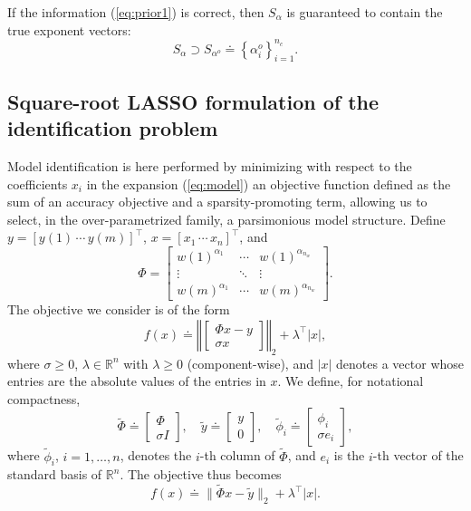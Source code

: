 \documentclass[11pt]{article}
\newcommand{\beq}{\begin{equation}}
\newcommand{\eeq}{\end{equation}}
\begin{document}
If the information (\ref{eq:prior1}) is correct, then $S_{\alpha}$
is guaranteed to contain the true exponent vectors:
\[
S_{\alpha}\supset S_{\alpha^{o}}\doteq\left\{ \alpha_{i}^{o}\right\} _{i=1}^{n_{c}}.
\]

\subsection{Square-root LASSO formulation of the identification problem}
Model identification is here performed by minimizing with respect to the coefficients $x_{i}$
in the expansion (\ref{eq:model})
an objective function defined as the sum of an accuracy objective
and a sparsity-promoting
term, allowing us to select, in the over-parametrized family, a parsimonious model structure. 
Define
 $y=[y(1)\,\cdots\, y(m)]^{\top}$, $x=[x_{1}\,\cdots\, x_{n}]^{\top}$,
and 
\[
\Phi=\left[\begin{array}{ccc}
w(1)^{\alpha_{1}} & \cdots & w(1)^{\alpha_{n_{w}}}\\
\vdots & \ddots & \vdots\\
w(m)^{\alpha_{1}} & \cdots & w(m)^{\alpha_{n_{w}}}
\end{array}\right].
\]
The objective we consider is of the form
\beq
f(x)\doteq\left\Vert \left[\begin{array}{c}
\Phi x-y\\
\sigma x
\end{array}\right]\right\Vert _{2}+\lambda^{\top}\left|x\right|,
\label{eq:f:obj}
\eeq
where $\sigma\geq 0$, $\lambda\in\mathbb{R}^{n}$ 
with $\lambda\geq 0$ (component-wise), and $|x|$ denotes a vector whose entries are
the absolute values of the entries in $x$.
We define, for notational
compactness, 
\[
\tilde{\Phi}\doteq\left[\begin{array}{c}
\Phi\\
\sigma I
\end{array}\right],\quad\tilde{y}\doteq\left[\begin{array}{c}
y\\
0
\end{array}\right],\quad\tilde{\phi}_{i}\doteq\left[\begin{array}{c}
\phi_{i}\\
\sigma e_{i}
\end{array}\right],
\]
where $\tilde{\phi}_{i}$, $i=1,\ldots,n$, denotes the $i$-th column
of $\tilde{\Phi}$, and $e_{i}$ is the $i$-th vector of the standard
basis of $\mathbb{R}^{n}$. The objective thus becomes
\beq
f(x)\doteq \|\tilde \Phi x -\tilde y\|_2 +\lambda^{\top}\left|x\right|.
\eeq
\end{document}
